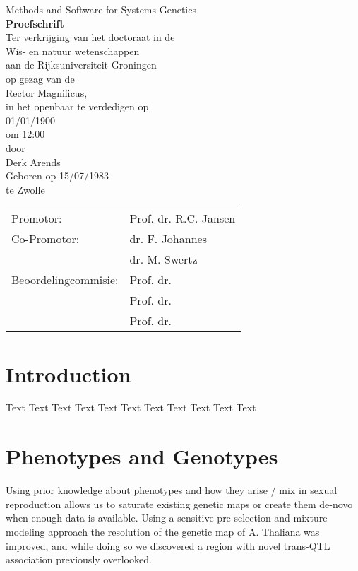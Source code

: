 \documentclass[10pt, oneside, a5paper]{report}
\newcommand{\bold}[1]{{\bfseries #1}}
\newcommand{\mytitle}[1]{{\LARGE #1}}
\begin{document}
\thispagestyle{empty}
\begin{center}
  \mytitle{Methods and Software for Systems Genetics}\\
    \vspace{10 mm}
  \bold{Proefschrift}\\
    \vspace{10 mm}
  Ter verkrijging van het doctoraat in de \\
  Wis- en natuur wetenschappen \\
  aan de Rijksuniversiteit Groningen \\
  op gezag van de \\
  Rector Magnificus, \\ 
  in het openbaar te verdedigen op \\
  01/01/1900 \\
  om 12:00 \\
    \vspace{10 mm}
  door\\
    \vspace{10 mm}
  Derk Arends\\
    \vspace{10 mm}
  Geboren op 15/07/1983\\
  te Zwolle
\end{center}

\newpage
\thispagestyle{empty}
\begin{tabular}{ l l }
Promotor:             & Prof. dr. R.C. Jansen \\
Co-Promotor:          & dr. F. Johannes \\
                      & dr. M. Swertz \\
Beoordelingcommisie:  & Prof. dr. \\
                      & Prof. dr. \\
                      & Prof. dr. \\
\end{tabular}

\tableofcontents

\chapter{Introduction}
Text Text Text Text Text Text Text Text Text Text Text

\chapter{Phenotypes and Genotypes}
Using prior knowledge about phenotypes and how they arise / mix in sexual reproduction allows us to saturate existing genetic maps or create them de-novo when enough data is available. Using a sensitive pre-selection and mixture modeling approach the resolution of the genetic map of A. Thaliana was improved, and while doing so we discovered a region with novel trans-QTL association previously overlooked.
\end{document}
